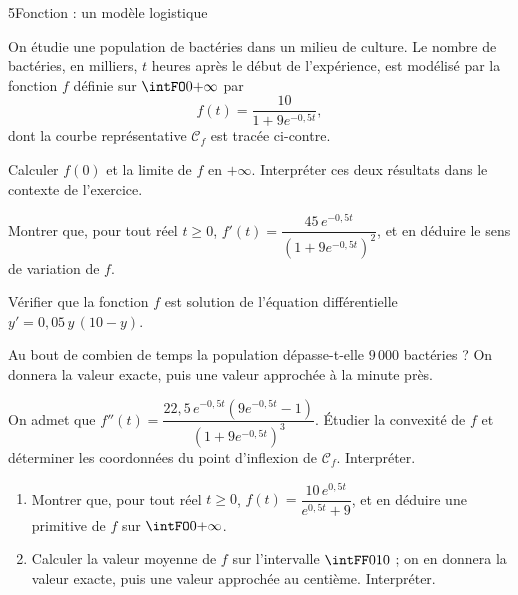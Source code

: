 \begin{exoBac}{5}{Fonction : un modèle logistique}
\begin{codecote}[0.56]
On étudie une population de bactéries dans un milieu de culture. Le nombre de bactéries, en milliers, $t$ heures après le début de
l'expérience, est modélisé par la fonction $f$ définie sur $\intFO0{+\infty}$ par
\[f(t)=\frac{10}{1+9e^{-0{,}5t}},\]
dont la courbe représentative $\mathcal{C}_f$ est tracée ci-contre.
\begin{questions}
  \item Calculer $f(0)$ et la limite de $f$ en $+\infty$. Interpréter ces deux résultats dans le contexte de l'exercice.
\end{questions}
\cote
\centering
{}
\end{codecote}
\begin{questions}[start=2]
  \item Montrer que, pour tout réel $t\geq0$, $f'(t)=\dfrac{45\,e^{-0{,}5t}}{\left(1+9e^{-0{,}5t}\right)^{2}}$, et en déduire le sens de
    variation de $f$.
  \item Vérifier que la fonction $f$ est solution de l'équation différentielle $y'=0{,}05\,y\,(10-y)$.
  \item Au bout de combien de temps la population dépasse-t-elle $9\,000$ bactéries ? On donnera la valeur exacte, puis une valeur
    approchée à la minute près.
  \item On admet que $f''(t)=\dfrac{22{,}5\,e^{-0{,}5t}\left(9e^{-0{,}5t}-1\right)}{\left(1+9e^{-0{,}5t}\right)^{3}}$. Étudier la
    convexité de $f$ et déterminer les coordonnées du point d'inflexion de $\mathcal{C}_f$. Interpréter.
  \item \begin{enumerate}[label=\alph*),leftmargin=1.4em,itemsep=0.4mm,topsep=0.4mm]
      \item Montrer que, pour tout réel $t\geq0$, $f(t)=\dfrac{10\,e^{0{,}5t}}{e^{0{,}5t}+9}$, et en déduire une primitive de $f$ sur
        $\intFO0{+\infty}$.
      \item Calculer la valeur moyenne de $f$ sur l'intervalle $\intFF0{10}$ ; on en donnera la valeur exacte, puis une valeur
        approchée au centième. Interpréter.
    \end{enumerate}
\end{questions}
\end{exoBac}
